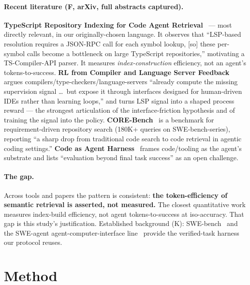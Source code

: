 \documentclass[11pt]{article}
\begin{document}
\paragraph{Recent literature (F, arXiv, full abstracts captured).}
\textbf{TypeScript Repository Indexing for Code Agent Retrieval}~\cite{tsindex} --- most directly
relevant, in our originally-chosen language. It observes that ``LSP-based resolution requires a JSON-RPC
call for each symbol lookup, [so] these per-symbol calls become a bottleneck on large TypeScript
repositories,'' motivating a TS-Compiler-API parser. It measures \emph{index-construction} efficiency,
not an agent's tokens-to-success. \textbf{RL from Compiler and Language Server Feedback}~\cite{rlcsf} argues compilers/type-checkers/language-servers ``already compute the missing
supervision signal \dots\ but expose it through interfaces designed for human-driven IDEs rather than
learning loops,'' and turns LSP signal into a shaped process reward --- the strongest articulation of
the interface-friction hypothesis and of training the signal into the policy. \textbf{CORE-Bench}~\cite{corebench} is a benchmark for requirement-driven repository search (180K+ queries on
SWE-bench-series), reporting ``a sharp drop from traditional code search to code retrieval in agentic
coding settings.'' \textbf{Code as Agent Harness}~\cite{codeharness} frames code/tooling as the agent's
substrate and lists ``evaluation beyond final task success'' as an open challenge.

\paragraph{The gap.} Across tools and papers the pattern is consistent: \textbf{the token-efficiency of
semantic retrieval is asserted, not measured.} The closest quantitative work measures index-build
efficiency, not agent tokens-to-success at iso-accuracy. That gap is this study's justification.
Established background (K): SWE-bench~\cite{swebench} and the SWE-agent agent-computer-interface
line~\cite{sweagent} provide the verified-task harness our protocol reuses.

\section{Method}
\end{document}
